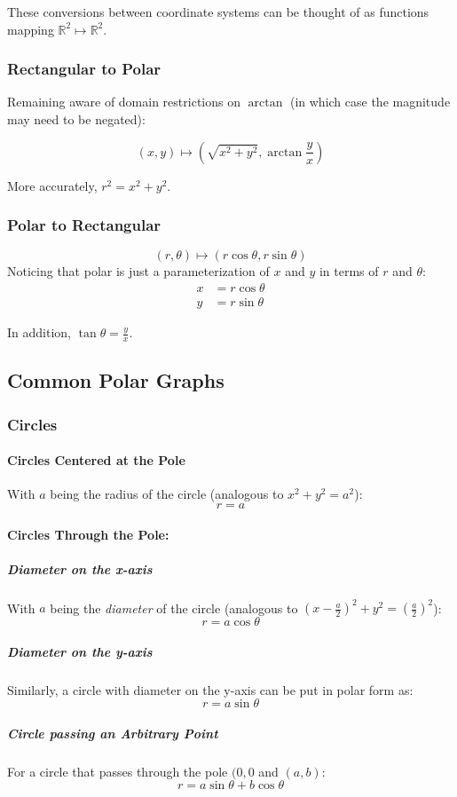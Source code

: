 \documentclass{article}
\begin{document}
These conversions between coordinate systems can be thought of as functions mapping $\mathbb{R}^2 \mapsto \mathbb{R}^2$.

\subsubsection{Rectangular to Polar}
Remaining aware of domain restrictions on $\arctan$ (in which case the magnitude may need to be negated):

$$(x,y) \mapsto \left( \sqrt{x^2+y^2}, \arctan{\frac{y}{x}}\right)$$

More accurately, $r^2 = x^2 + y^2$.

\subsubsection{Polar to Rectangular}
$$(r, \theta) \mapsto (r \cos{\theta}, r \sin{\theta})$$
Noticing that polar is just a parameterization of $x$ and $y$ in terms of $r$ and $\theta$:
\begin{align*}
    x &= r \cos{\theta} \\
    y &= r \sin{\theta}
\end{align*}

In addition, $\tan{\theta} = \frac{y}{x}$.

\subsection{Common Polar Graphs}
\subsubsection{Circles}

\paragraph{Circles Centered at the Pole}
With $a$ being the radius of the circle (analogous to $x^2+y^2=a^2$):
$$r = a$$

\paragraph{Circles Through the Pole:}
\subparagraph{Diameter on the x-axis}
With $a$ being the \emph{diameter} of the circle (analogous to $\left(x - \frac{a}{2}\right)^2+y^2=\left(\frac{a}{2}\right)^2$):
$$r=a \cos{\theta}$$
\subparagraph{Diameter on the y-axis}
Similarly, a circle with diameter on the y-axis can be put in polar form as:
$$r=a \sin{\theta}$$
\subparagraph{Circle passing an Arbitrary Point}
For a circle that passes through the pole $(0,0$ and $(a,b)$:
$$r = a\sin{\theta} + b\cos{\theta}$$
\end{document}
